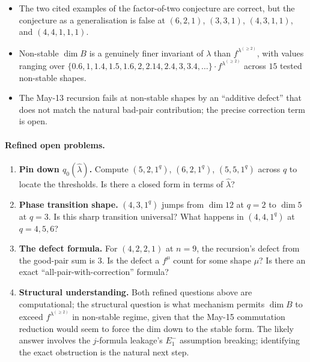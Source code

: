 \documentclass[11pt]{article}
\theoremstyle{definition}
\begin{document}
\begin{itemize}[topsep=0.3em,itemsep=0.2em]
\item The two cited examples of the factor-of-two conjecture are
correct, but the conjecture as a generalisation is false at
$(6, 2, 1)$, $(3, 3, 1)$, $(4, 3, 1, 1)$, and $(4, 4, 1, 1, 1)$.
\item Non-stable $\dim B$ is a genuinely finer invariant of $\lambda$
than $f^{\lambda^{(\ge 2)}}$, with values ranging over $\{0.6, 1, 1.4,
1.5, 1.6, 2, 2.14, 2.4, 3, 3.4, \ldots\} \cdot f^{\lambda^{(\ge 2)}}$
across $15$ tested non-stable shapes.
\item The May-13 recursion fails at non-stable shapes by an
``additive defect'' that does not match the natural bad-pair
contribution; the precise correction term is open.
\end{itemize}

\paragraph{Refined open problems.}
\begin{enumerate}[topsep=0.3em,itemsep=0.2em]
\item \textbf{Pin down $q_0(\widehat\lambda)$.}  Compute
$(5, 2, 1^q)$, $(6, 2, 1^q)$, $(5, 5, 1^q)$ across $q$ to locate the
thresholds.  Is there a closed form in terms of $\widehat\lambda$?
\item \textbf{Phase transition shape.}  $(4, 3, 1^q)$ jumps from
$\dim 12$ at $q = 2$ to $\dim 5$ at $q = 3$.  Is this sharp transition
universal?  What happens in $(4, 4, 1^q)$ at $q = 4, 5, 6$?
\item \textbf{The defect formula.}  For $(4, 2, 2, 1)$ at $n = 9$,
the recursion's defect from the good-pair sum is $3$.  Is the defect
a $f^\mu$ count for some shape $\mu$?  Is there an exact
``all-pair-with-correction'' formula?
\item \textbf{Structural understanding.}  Both refined questions
above are computational; the structural question is what mechanism
permits $\dim B$ to exceed $f^{\lambda^{(\ge 2)}}$ in non-stable
regime, given that the May-15 commutation reduction would seem to
force the dim down to the stable form.  The likely answer involves
the $j$-formula leakage's $E_1^-$ assumption breaking; identifying
the exact obstruction is the natural next step.
\end{enumerate}
\end{document}
